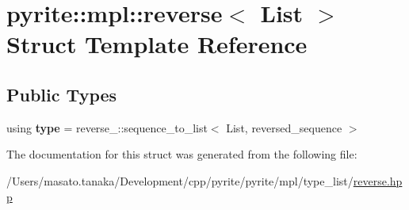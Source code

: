 \hypertarget{structpyrite_1_1mpl_1_1reverse}{}\section{pyrite\+:\+:mpl\+:\+:reverse$<$ List $>$ Struct Template Reference}
\label{structpyrite_1_1mpl_1_1reverse}
\subsection*{Public Types}
\begin{DoxyCompactItemize}
\item 
\mbox{\label{structpyrite_1_1mpl_1_1reverse_ad0fc79c5adba1db095b4dd23d979e24f}} 
using {\bfseries type} = reverse\+\_\+\+::sequence\+\_\+to\+\_\+list$<$ List, reversed\+\_\+sequence $>$
\end{DoxyCompactItemize}


The documentation for this struct was generated from the following file\+:\begin{DoxyCompactItemize}
\item 
/\+Users/masato.\+tanaka/\+Development/cpp/pyrite/pyrite/mpl/type\+\_\+list/\mbox{\hyperlink{reverse_8hpp}{reverse.\+hpp}}\end{DoxyCompactItemize}
